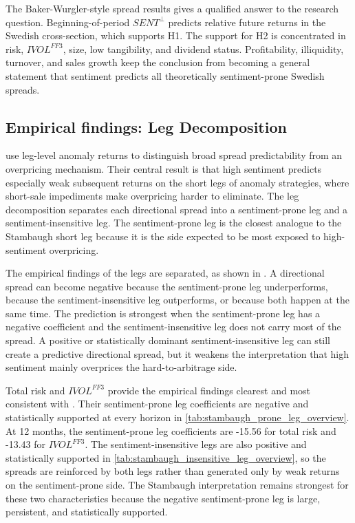 \documentclass[11pt]{article}
\newcommand{\var}[1]{\ensuremath{#1}}
\begin{document}
The Baker-Wurgler-style spread results gives a qualified answer to the research question. Beginning-of-period \var{SENT^{\perp}} predicts relative future returns in the Swedish cross-section, which supports H1. The support for H2 is concentrated in risk, \var{IVOL^{FF3}}, size, low tangibility, and dividend status. Profitability, illiquidity, turnover, and sales growth keep the conclusion from becoming a general statement that sentiment predicts all theoretically sentiment-prone Swedish spreads.

\subsection{Empirical findings: Leg Decomposition}
\citet{stambaugh2012short} use leg-level anomaly returns to distinguish broad spread predictability from an overpricing mechanism. Their central result is that high sentiment predicts especially weak subsequent returns on the short legs of anomaly strategies, where short-sale impediments make overpricing harder to eliminate. The leg decomposition separates each directional spread into a sentiment-prone leg and a sentiment-insensitive leg. The sentiment-prone leg is the closest analogue to the Stambaugh short leg because it is the side expected to be most exposed to high-sentiment overpricing.

The empirical findings of the legs are separated, as shown in . A directional spread can become negative because the sentiment-prone leg underperforms, because the sentiment-insensitive leg outperforms, or because both happen at the same time. The prediction is strongest when the sentiment-prone leg has a negative coefficient and the sentiment-insensitive leg does not carry most of the spread. A positive or statistically dominant sentiment-insensitive leg can still create a predictive directional spread, but it weakens the interpretation that high sentiment mainly overprices the hard-to-arbitrage side.

Total risk and \var{IVOL^{FF3}} provide the empirical findings clearest and most consistent with \citet{stambaugh2012short}. Their sentiment-prone leg coefficients are negative and statistically supported at every horizon in \cref{tab:stambaugh_prone_leg_overview}. At 12 months, the sentiment-prone leg coefficients are -15.56 for total risk and -13.43 for \var{IVOL^{FF3}}. The sentiment-insensitive legs are also positive and statistically supported in \cref{tab:stambaugh_insensitive_leg_overview}, so the spreads are reinforced by both legs rather than generated only by weak returns on the sentiment-prone side. The Stambaugh interpretation remains strongest for these two characteristics because the negative sentiment-prone leg is large, persistent, and statistically supported.
\end{document}
